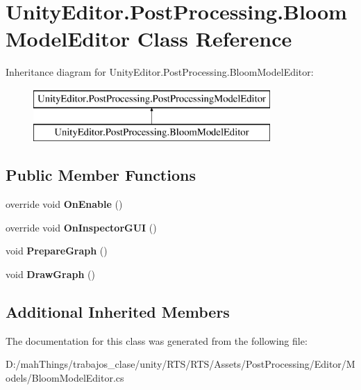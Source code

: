 \hypertarget{class_unity_editor_1_1_post_processing_1_1_bloom_model_editor}{}\section{Unity\+Editor.\+Post\+Processing.\+Bloom\+Model\+Editor Class Reference}
\label{class_unity_editor_1_1_post_processing_1_1_bloom_model_editor}
Inheritance diagram for Unity\+Editor.\+Post\+Processing.\+Bloom\+Model\+Editor\+:\begin{figure}[H]
\begin{center}
\leavevmode
\includegraphics[height=2.000000cm]{class_unity_editor_1_1_post_processing_1_1_bloom_model_editor}
\end{center}
\end{figure}
\subsection*{Public Member Functions}
\begin{DoxyCompactItemize}
\item 
\mbox{\label{class_unity_editor_1_1_post_processing_1_1_bloom_model_editor_a9e243b49c284dfd0018e7eb8c03b0076}} 
override void {\bfseries On\+Enable} ()
\item 
\mbox{\label{class_unity_editor_1_1_post_processing_1_1_bloom_model_editor_a8ae605305e02f59af174837e93ff5b02}} 
override void {\bfseries On\+Inspector\+G\+UI} ()
\item 
\mbox{\label{class_unity_editor_1_1_post_processing_1_1_bloom_model_editor_aef1c3035ae1a315f947e7a9a142bafd8}} 
void {\bfseries Prepare\+Graph} ()
\item 
\mbox{\label{class_unity_editor_1_1_post_processing_1_1_bloom_model_editor_a53d75ccee84ca82e213efc09700fdffd}} 
void {\bfseries Draw\+Graph} ()
\end{DoxyCompactItemize}
\subsection*{Additional Inherited Members}


The documentation for this class was generated from the following file\+:\begin{DoxyCompactItemize}
\item 
D\+:/mah\+Things/trabajos\+\_\+clase/unity/\+R\+T\+S/\+R\+T\+S/\+Assets/\+Post\+Processing/\+Editor/\+Models/Bloom\+Model\+Editor.\+cs\end{DoxyCompactItemize}
